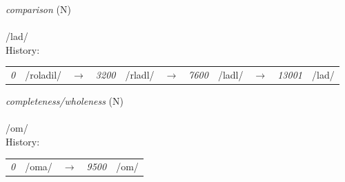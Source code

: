 \vspace{15pt}
\begin{nopagebreak}
 \textit{comparison} (N)\\
\\
\noindent /l{\textprimstress}ad/\\


\noindent History:

\vspace{-0pt}
\hspace{40pt}
\begin{tabular}{ccc}
\textit{0} & /roladil/&$\rightarrow$ & \textit{3200} & /rladl/&$\rightarrow$ & \textit{7600} & /ladl/&$\rightarrow$ & \textit{13001} & /lad/& \\
\end{tabular}

\vspace{20pt}\hline

\end{nopagebreak}
\filbreak



\vspace{15pt}
\begin{nopagebreak}
 \textit{completeness/wholeness} (N)\\
\\
\noindent /{\textprimstress}om/\\


\noindent History:

\vspace{-0pt}
\hspace{40pt}
\begin{tabular}{ccc}
\textit{0} & /oma/&$\rightarrow$ & \textit{9500} & /om/& \\
\end{tabular}

\vspace{20pt}\hline

\end{nopagebreak}
\filbreak



